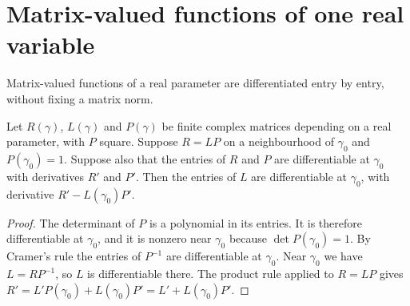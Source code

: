\section{Matrix-valued functions of one real variable}

Matrix-valued functions of a real parameter are differentiated entry by
entry, without fixing a matrix norm.

\begin{lemma}
    \label{lem:glm_l_path_quotient_rule}
    \leanok
    Let $R(\gamma)$, $L(\gamma)$ and $P(\gamma)$ be finite complex matrices
    depending on a real parameter, with $P$ square. Suppose $R=LP$ on a
    neighbourhood of $\gamma_0$ and $P(\gamma_0)=1$. Suppose also that the
    entries of $R$ and $P$ are differentiable at $\gamma_0$ with derivatives
    $R'$ and $P'$. Then the entries of $L$ are differentiable at $\gamma_0$,
    with derivative $R'-L(\gamma_0)P'$.
\end{lemma}
\begin{proof}
    \leanok
    The determinant of $P$ is a polynomial in its entries. It is therefore
    differentiable at $\gamma_0$, and it is nonzero near $\gamma_0$ because
    $\det P(\gamma_0)=1$. By Cramer's rule the entries of $P^{-1}$ are
    differentiable at $\gamma_0$. Near $\gamma_0$ we have $L=RP^{-1}$, so
    $L$ is differentiable there. The product rule applied to $R=LP$ gives
    $R'=L'P(\gamma_0)+L(\gamma_0)P'=L'+L(\gamma_0)P'$.
\end{proof}

